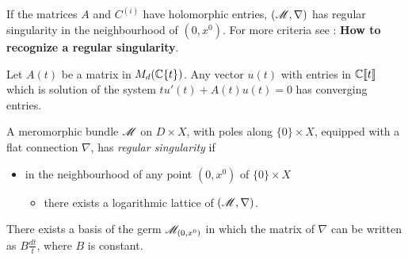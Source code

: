 If the matrices $A$ and $C^{(i)}$ have holomorphic entries, $(\mathscr{M},\nabla)$ has
regular singularity in the neighbourhood of $(0,x^0)$. For more criteria see
\cite[II.4.a]{sabbah2007isomonodromic}: \textbf{How to recognize a regular
  singularity}.
\begin{prop}
  Let $A(t)$ be a matrix in $M_d(\mathbb{C}\{t\})$. Any vector $u(t)$ with entries in
  $\mathbb{C}\llbracket t\rrbracket$ which is solution of the system
  $tu'(t)+A(t)u(t)=0$ has converging entries.
\end{prop}
\begin{defn}[II.2.24]
  A meromorphic bundle $\mathscr{M}$ on $D\times X$, with poles along $\{0\}\times X$,
  equipped with a flat connection $\nabla$, has \emph{regular singularity} if
  \begin{itemize}
    \item in the neighbourhood of any point $(0,x^0)$ of $\{0\}\times X$
      \begin{itemize}
        \item there exists a logarithmic lattice of $(\mathscr{M},\nabla)$.
      \end{itemize}
  \end{itemize}
\end{defn}
\begin{thm}
  There exists a basis of the germ $\mathscr{M}_{(0,x^0)}$ in which the matrix of
  $\nabla$ can be written as $B\frac{dt}{t}$, where $B$ is constant.
\end{thm}
